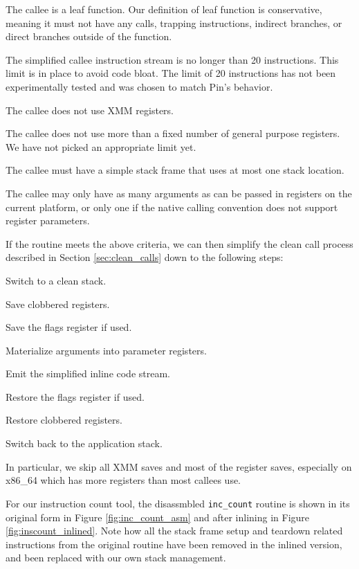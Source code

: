 \begin{packed_itemize}
\item The callee is a leaf function.  Our definition of leaf function is
conservative, meaning it must not have any calls, trapping instructions,
indirect branches, or direct branches outside of the function.
\item The simplified callee instruction stream is no longer than 20
instructions.  This limit is in place to avoid code bloat.  The limit of 20
instructions has not been experimentally tested and was chosen to match Pin's
behavior.
\item The callee does not use XMM registers.
\item The callee does not use more than a fixed number of general purpose
registers.  We have not picked an appropriate limit yet.
\item The callee must have a simple stack frame that uses at most one stack
location.
\item The callee may only have as many arguments as can be passed in registers
on the current platform, or only one if the native calling convention does not
support register parameters.
\end{packed_itemize}

If the routine meets the above criteria, we can then simplify the clean call
process described in Section \ref{sec:clean_calls} down to the following steps:

\begin{packed_enumerate}
\item Switch to a clean stack.
\item Save clobbered registers.
\item Save the flags register if used.
\item Materialize arguments into parameter registers.
\item Emit the simplified inline code stream.
\item Restore the flags register if used.
\item Restore clobbered registers.
\item Switch back to the application stack.
\end{packed_enumerate}

In particular, we skip all XMM saves and most of the register saves, especially
on x86\_64 which has more registers than most callees use.

For our instruction count tool, the disassmbled {\tt inc\_count} routine is
shown in its original form in Figure \ref{fig:inc_count_asm} and after inlining
in Figure \ref{fig:inscount_inlined}.  Note how all the stack frame setup and
teardown related instructions from the original routine have been removed in the
inlined version, and been replaced with our own stack management.


